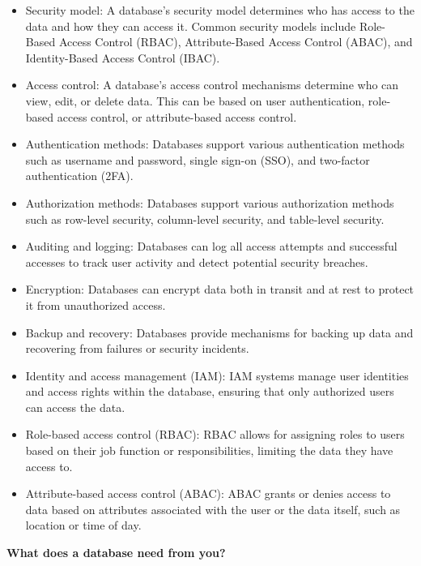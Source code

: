 \documentclass[
  letterpaper,
  DIV=11,
  numbers=noendperiod]{scrreprt}
\begin{document}
\begin{tcolorbox}
\begin{itemize}
\item
  Security model: A database's security model determines who has access
  to the data and how they can access it. Common security models include
  Role-Based Access Control (RBAC), Attribute-Based Access Control
  (ABAC), and Identity-Based Access Control (IBAC).
\item
  Access control: A database's access control mechanisms determine who
  can view, edit, or delete data. This can be based on user
  authentication, role-based access control, or attribute-based access
  control.
\item
  Authentication methods: Databases support various authentication
  methods such as username and password, single sign-on (SSO), and
  two-factor authentication (2FA).
\item
  Authorization methods: Databases support various authorization methods
  such as row-level security, column-level security, and table-level
  security.
\item
  Auditing and logging: Databases can log all access attempts and
  successful accesses to track user activity and detect potential
  security breaches.
\item
  Encryption: Databases can encrypt data both in transit and at rest to
  protect it from unauthorized access.
\item
  Backup and recovery: Databases provide mechanisms for backing up data
  and recovering from failures or security incidents.
\item
  Identity and access management (IAM): IAM systems manage user
  identities and access rights within the database, ensuring that only
  authorized users can access the data.
\item
  Role-based access control (RBAC): RBAC allows for assigning roles to
  users based on their job function or responsibilities, limiting the
  data they have access to.
\item
  Attribute-based access control (ABAC): ABAC grants or denies access to
  data based on attributes associated with the user or the data itself,
  such as location or time of day.
\end{itemize}

\end{tcolorbox}

\textbf{What does a database need from you?}
\end{document}
